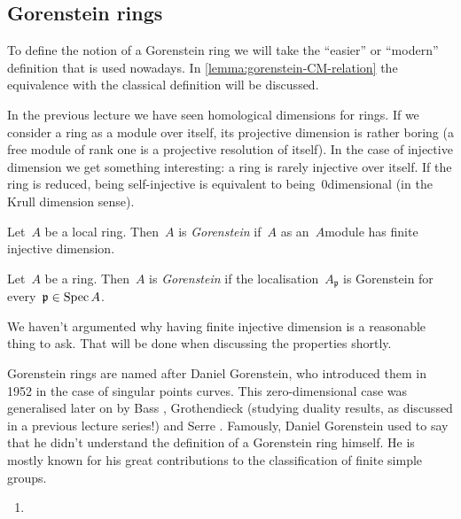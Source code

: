 \documentclass[10pt,a4paper]{article}
\begin{document}
\subsection{Gorenstein rings}
To define the notion of a Gorenstein ring we will take the ``easier'' or ``modern'' definition that is used nowadays. In \cref{lemma:gorenstein-CM-relation} the equivalence with the classical definition will be discussed.

In the previous lecture we have seen homological dimensions for rings. If we consider a ring as a module over itself, its projective dimension is rather boring (a free module of rank one is a projective resolution of itself). In the case of injective dimension we get something interesting: a ring is rarely injective over itself. If the ring is reduced, being self-injective is equivalent to being~$0$\dash dimensional (in the Krull dimension sense).

\begin{definition}
  Let~$A$ be a local ring. Then~$A$ is \emph{Gorenstein} if~$A$ as an~$A$\dash module has finite injective dimension.
  
  Let~$A$ be a ring. Then~$A$ is \emph{Gorenstein} if the localisation~$A_{\mathfrak{p}}$ is Gorenstein for every~$\mathfrak{p}\in\operatorname{Spec} A$.
\end{definition}

We haven't argumented why having finite injective dimension is a reasonable thing to ask. That will be done when discussing the properties shortly.

\begin{remark}
  Gorenstein rings are named after Daniel Gorenstein, who introduced them in 1952 \cite{gorenstein-arithmetic-theory-adjoint-plane-curves} in the case of singular points curves. This zero-dimensional case was generalised later on by Bass \cite{bass-ubiquity-gorenstein-rings}, Grothendieck \cite{grothendieck-theoremes-de-dualite} (studying duality results, as discussed in a previous lecture series!) and Serre \cite{serre-sur-les-modules-projectifs}. Famously, Daniel Gorenstein used to say that he didn't understand the definition of a Gorenstein ring himself. He is mostly known for his great contributions to the classification of finite simple groups.
\end{remark}

\begin{enumerate}
  \item 
\end{enumerate}
\end{document}

